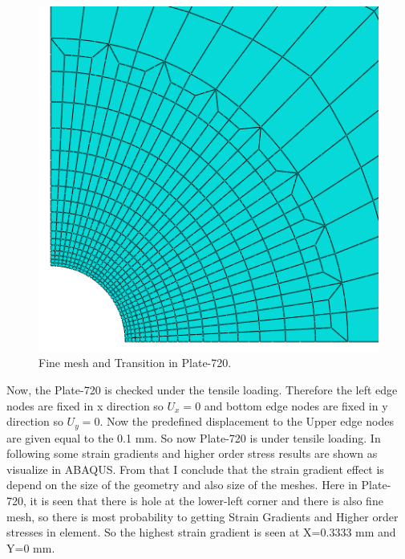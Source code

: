 \documentclass[12pt]{article}
\begin{document}
\begin{figure}[H]
	\begin{center}
		\includegraphics[scale=0.38]{fine_mesh_part.png} 
	\end{center} 
   \caption{Fine mesh and Transition in Plate-720.} 
\end{figure}
Now, the Plate-720 is checked under the tensile loading. Therefore the left edge nodes are fixed in x direction so $U_x = 0$ and bottom edge nodes are fixed in y direction so $U_y = 0$. Now the predefined displacement to the Upper edge nodes are given equal to the 0.1 mm. So now Plate-720 is under tensile loading. In following some strain gradients and higher order stress results are shown as visualize in ABAQUS. From that I conclude that the strain gradient effect is depend on the size of the geometry and also size of the meshes. Here in Plate-720, it is seen that there is hole at the lower-left corner and there is also fine mesh, so there is most probability to getting Strain Gradients and Higher order stresses in element. So the highest strain gradient is seen at X=0.3333 mm and Y=0 mm.
\vspace{3cm} 
\end{document}
